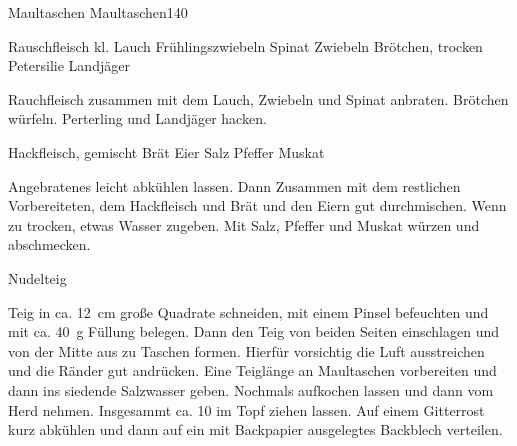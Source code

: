 \begin{MyRecipe}{Maultaschen}{ Maultaschen}{\SI{140}{\minuteprime} }

	
	


\ingredient[\Calc{0.25}{\x}]{\si{\kilogram}} {Rauschfleisch}
\ingredient[\Calc{1}{\x}]{} {kl. Lauch}
\ingredient[\Calc{1.5}{\x}]{} {Frühlingszwiebeln}
\ingredient[\Calc{0.3}{\x}]{\si{\kilogram}} {Spinat}
\ingredient[\Calc{2}{\x}]{} {Zwiebeln}
\ingredient[\Calc{3}{\x}]{} {Brötchen, trocken}
\ingredient[\Calc{1}{\x}]{\si{\Bund}} {Petersilie}
 {Landjäger}

Rauchfleisch zusammen mit dem Lauch, Zwiebeln und Spinat anbraten.	Brötchen würfeln. Perterling und Landjäger hacken.\par\bigskip

\ingredient[\Calc{1}{\x}]{\si{\kilogram}} {Hackfleisch, gemischt}
\ingredient[\Calc{0.5}{\x}]{\si{\kilogram}} {Brät}
\ingredient[\Calc{6.5}{\x}]{} {Eier}
\ingredient[]{} {Salz}
\ingredient[]{} {Pfeffer}
\ingredient[]{} {Muskat}

Angebratenes leicht abkühlen lassen. Dann Zusammen mit dem restlichen Vorbereiteten, dem Hackfleisch und Brät und den Eiern gut durchmischen. Wenn zu trocken, etwas Wasser zugeben. Mit Salz, Pfeffer und Muskat würzen und abschmecken.\par\bigskip

\ingredient[\Calc{1.2}{\x}]{\si{\kilogram}} {Nudelteig}
	
Teig in ca. \SI{12}{\centi\meter} große Quadrate schneiden, mit einem Pinsel befeuchten und mit ca. \SI{40}{\gram} Füllung belegen. Dann den Teig von beiden Seiten einschlagen und von der Mitte aus zu Taschen formen. Hierfür vorsichtig die Luft ausstreichen und die Ränder gut andrücken. Eine Teiglänge an Maultaschen vorbereiten und dann ins siedende Salzwasser geben. Nochmals aufkochen lassen und dann vom Herd nehmen. Insgesammt ca. \SI{10}{\minuteprime} im Topf ziehen lassen. Auf einem Gitterrost kurz abkühlen und dann auf ein mit Backpapier ausgelegtes Backblech verteilen.





	
\end{MyRecipe}